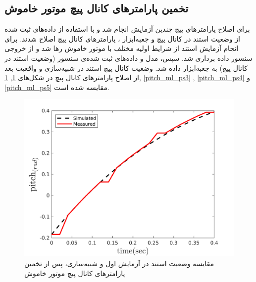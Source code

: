 \subsection{تخمین پارامترهای کانال پیچ موتور خاموش}
برای اصلاح پارامترهای پیچ چندین آزمایش انجام شد و با استفاده از داده‌های ثبت شده از وضعیت استند در کانال پیچ و جعبه‌ابزار
،
پارامترهای کانال پیچ اصلاح شدند.
برای انجام آزمایش استند از شرایط اولیه مختلف با موتور خاموش رها شد  و از خروجی سنسور داده برداری شد. سپس، مدل و داده‌های ثبت شده‌ی سنسور (وضعیت استند در کانال پیچ) به جعبه‌ابزار
داده شد. وضعیت کانال پیچ استند در شبیه‌سازی و واقعیت بعد از اصلاح پارامترهای کانال پیچ در شکل‌های
\ref{pitch_ml_ps1}, \ref{pitch_ml_ps1}, \ref{pitch_ml_ps3} , \ref{pitch_ml_ps4}  و \ref{pitch_ml_ps5}
مقایسه شده است.

\begin{figure}[H]
	\includegraphics[width=12cm]{../Figures/RCP/pitch_ml_parameter_estimation/RCP_pitch_S1.png}
	\centering
	\caption{مقايسه وضعیت استند در  آزمايش اول و شبیه‌سازی، پس از تخمین پارامترهای کانال پیچ موتور خاموش}
	\label{pitch_ml_ps1}
\end{figure}

